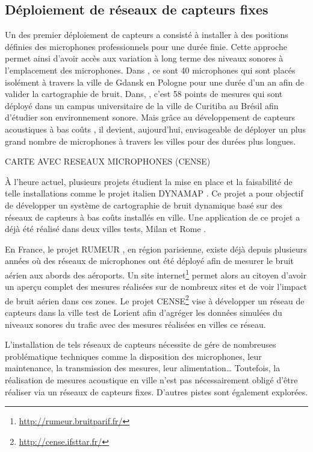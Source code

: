 \subsection{Déploiement de réseaux de capteurs fixes}

Un des premier déploiement de capteurs a consisté à installer à des positions définies des microphones professionnels pour une durée finie. Cette approche permet ainsi d'avoir accès aux variation à long terme des niveaux sonores à l'emplacement des microphones.
Dans \cite{Mioduszewski}, ce sont 40 microphones qui sont placés isolément à travers la ville de Gdansk en Pologne pour une durée d'un an afin de valider la cartographie de bruit. Dans, \cite{zannin_characterization_2013}, c'est 58 points de mesures qui sont déployé dans un campus universitaire de la ville de Curitiba au Brésil afin d'étudier son environnement sonore. Mais grâce au développement de capteurs acoustiques à bas coûts \cite{van2010use}, il devient, aujourd'hui, envisageable de déployer un plus grand nombre de microphones à travers les villes pour des durées plus longues. 

CARTE AVEC RESEAUX MICROPHONES (CENSE)

\`A l'heure actuel, plusieurs projets étudient la mise en place et la faisabilité de telle installations comme le projet italien DYNAMAP \cite{dynamap_2016}. Ce projet a pour objectif de développer un système de cartographie de bruit dynamique basé sur des réseaux de capteurs à bas coûts installés en ville. Une application de ce projet a déjà été réalisé dans deux villes tests, Milan et Rome \cite{bellucci_life_2017}. 


En France, le projet RUMEUR \cite{mietlicki2012innovative}, en région parisienne, existe déjà depuis plusieurs années où des réseaux de microphones ont été déployé afin de mesurer le bruit aérien aux abords des aéroports. Un site internet\footnote{\url{http://rumeur.bruitparif.fr/}} permet alors au citoyen d'avoir un aperçu complet des mesures réalisées sur de nombreux sites et de voir l'impact de bruit aérien dans ces zones. Le projet CENSE\footnote{\url{http://cense.ifsttar.fr/}} vise à développer un réseau de capteurs dans la ville test de Lorient afin d'agréger les données simulées du niveaux sonores du trafic avec des mesures réalisées en villes ce réseau.  

L'installation de tels réseaux de capteurs nécessite de gére de nombreuses problématique techniques comme la disposition des microphones, leur maintenance, la transmission des mesures, leur alimentation\dots{}
Toutefois, la réalisation de mesures acoustique en ville n'est pas nécessairement obligé d'être réaliser via un réseaux de capteurs fixes. D'autres pistes sont également explorées.

